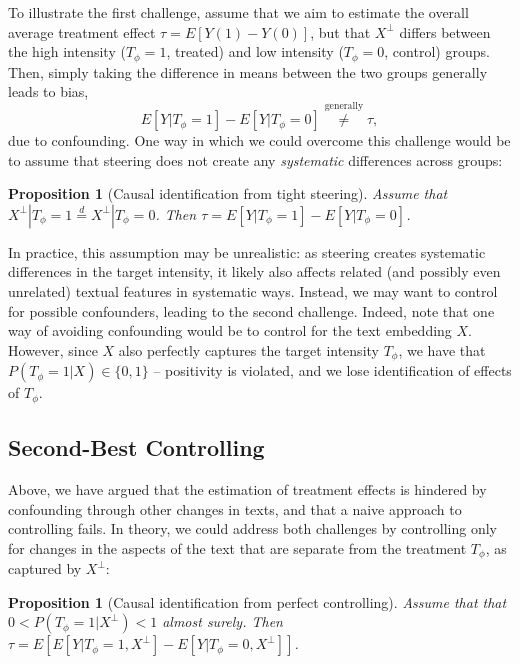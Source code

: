 \documentclass{article}
\theoremstyle{plain}
\newtheorem{proposition}[theorem]{Proposition}
\theoremstyle{definition}
\theoremstyle{remark}
\begin{document}
To illustrate the first challenge, assume that we aim to estimate the overall average treatment effect $\tau = E[Y(1) - Y(0)]$, but that $X^\perp$ differs between the high intensity ($T_\phi{=}1$, treated) and low intensity ($T_\phi{=}0$, control) groups. 
Then, simply taking the difference in means between the two groups generally leads to bias,
\begin{equation*}
    E[Y | T_\phi{=}1] - E[Y|T_\phi{=}0] \stackrel{\text{generally}}{\neq} \tau,
\end{equation*}
due to confounding.
One way in which we could overcome this challenge would be to assume that steering does not create any \emph{systematic} differences across groups:

\begin{proposition}[Causal identification from tight steering]
\label{prop:tightsteering}
    Assume that $X^\perp |T_\phi{=}1 \stackrel{d}{=} X^\perp |T_\phi{=}0$.
    Then $\tau = E[Y | T_\phi{=}1] - E[Y|T_\phi{=}0]$.
\end{proposition}

In practice, this assumption may be unrealistic: as steering creates systematic differences in the target intensity, it likely also affects related (and possibly even unrelated) textual features in systematic ways.
Instead, we may want to control for possible confounders, leading to the second challenge.
Indeed, note that one way of avoiding confounding would be to control for the text embedding $X$. However, since $X$ also perfectly captures the target intensity $T_\phi$, we have that $ P(T_\phi{=}1|X) \in \{0,1\}$ -- positivity is violated, and we lose identification of effects of $T_\phi$.

\subsection{Second-Best Controlling}
\label{sec:limitedcontrol}

Above, we have argued that the estimation of treatment effects is hindered by confounding through other changes in texts, and that a naive approach to controlling fails. 
In theory, we could address both challenges by controlling only for changes in the aspects of the text that are separate from the treatment $T_\phi$, as captured by $X^\perp$:

\begin{proposition}[Causal identification from perfect controlling]
\label{prop:perfectcontrolling}
    Assume that that $0 < P(T_\phi{=}1|X^\perp) < 1$ almost surely.
    Then $\tau = E[E[Y|T_\phi{=}1,X^\perp] - E[Y|T_\phi{=}0,X^\perp]]$.
\end{proposition}
\end{document}
